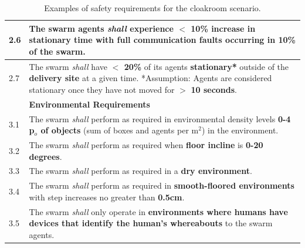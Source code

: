 \documentclass[runningheads]{llncs}
\begin{document}
\begin{table}[!t]
\begin{tabular}{p{5mm} p{116mm} }
		\hline
		2.6 & The swarm agents \emph{shall} experience $<$ \textbf{10\%} increase in \textbf{stationary time} with \textbf{full communication faults} occurring in \textbf{10\%} of the swarm. \\	
		\hline
		2.7 & The swarm \emph{shall} have \textbf{$<$ 20\%} of its agents \textbf{stationary*} outside of the \textbf{delivery site} at a given time.
		*Assumption: Agents are considered stationary once they have not moved for $>$ \textbf{10 seconds}. \\
		\hline
		& \textbf{Environmental Requirements}\\
		\hline
		3.1 & The swarm \emph{shall} perform as required in environmental density levels \textbf{0-4 p$_o$ of objects} (sum of boxes and agents per m$^2$) in the environment. %
		\\ 
		\hline
		3.2 & The swarm \emph{shall} perform as required when \textbf{floor incline} is \textbf{0-20 degrees}.
		\\ 
		\hline
		3.3 & The swarm \emph{shall} perform as required in a \textbf{dry environment}.
		\\ 
		\hline
		3.4 & The swarm \emph{shall} perform as required in \textbf{smooth-floored environments} with step increases no greater than \textbf{0.5cm}.
		\\ 
		\hline
		3.5 & The swarm \emph{shall} only operate in \textbf{environments where humans have devices that identify the human’s whereabouts} to the swarm agents.
		\\		[1ex] 		
		\hline
	\end{tabular}
	\caption{\label{tab:reqs}Examples of safety requirements for the cloakroom scenario.}
	\vspace{-4ex}
\end{table}

\end{document}
